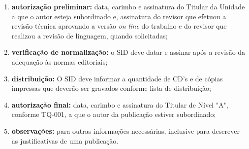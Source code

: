 \begin{enumerate}
    \item \textbf{autorização preliminar:} data, carimbo e assinatura do Titular da Unidade a que o autor esteja subordinado e, assinatura do revisor que efetuou a revisão técnica aprovando a versão \emph{on line} do trabalho e do revisor que realizou a revisão de linguagem, quando solicitadas; 
    
  \item \textbf{verificação de normalização:} o SID deve datar e assinar após a revisão da adequação às normas editoriais;   
  
  \item \textbf{distribuição:} O SID deve informar a quantidade de CD's e de cópias impressas que deverão ser gravados conforme lista de distribuição;
  
 \item \textbf{autorização final:} data, carimbo e assinatura do Titular de Nível "A", conforme TQ-001, a que o autor da publicação estiver subordinado;
 
 \item \textbf{observações:} para outras informações necessárias, inclusive para descrever as justificativas de uma publicação.
\end{enumerate}
